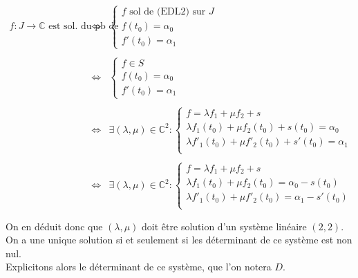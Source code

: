 \documentclass{article}
\begin{document}
\begin{question_kholle}
 	$$\begin{array}{ccl}
 		f : J \to \mathbb{C} \text{ est sol. du pb de Cauchy }
 		& \iff & \left\{ \begin{array}{l}
 			f \text{ sol de (EDL2) sur } J \\
 			f(t_{0}) = \alpha_{0}          \\
 			f'(t_{0}) = \alpha_{1}
 		\end{array}  \right.                                                                                \\\\
 		& \iff & \left\{ \begin{array}{l}
 			f \in S               \\
 			f(t_{0}) = \alpha_{0} \\
 			f'(t_{0}) = \alpha_{1}
 		\end{array}\right.                                                                                         \\\\
 		& \iff & \exists (\lambda, \mu) \in \mathbb{C}^{2}: \left\{ \begin{array}{l}
 			f = \lambda f_{1} + \mu f_{2} + s                                  \\
 			\lambda f_{1}(t_{0}) + \mu f_{2}(t_{0}) + s(t_{0}) = \alpha_{0}    \\
 			\lambda f'_{1}(t_{0}) + \mu f'_{2}(t_{0}) + s'(t_{0}) = \alpha_{1} \\
 		\end{array} \right. \\\\
 		& \iff & \exists (\lambda, \mu) \in \mathbb{C}^{2}: \left\{ \begin{array}{l}
 			f = \lambda f_{1} + \mu f_{2} + s                                  \\
 			\lambda f_{1}(t_{0}) + \mu f_{2}(t_{0}) = \alpha_{0} - s(t_{0})    \\
 			\lambda f'_{1}(t_{0}) + \mu f'_{2}(t_{0}) = \alpha_{1} - s'(t_{0}) \\
 		\end{array} \right. \\\\
 	\end{array} $$
 	On en déduit donc que $(\lambda, \mu)$ doit être solution d'un système linéaire $(2,2)$. On a une unique solution si et seulement si les déterminant de ce système est non nul. \\
 	Explicitons alors le déterminant de ce système, que l'on notera $D$.

\end{question_kholle}
\end{document}

